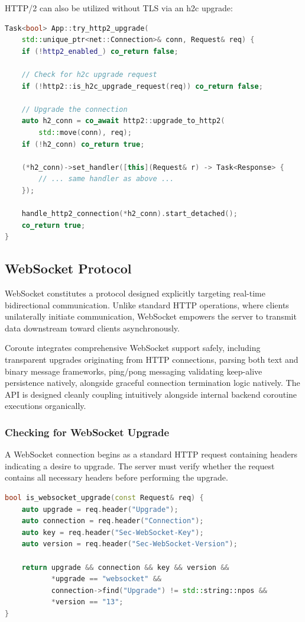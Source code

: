 HTTP/2 can also be utilized without TLS via an h2c upgrade:

\begin{lstlisting}[language=C++, basicstyle=\small\ttfamily, caption={h2c upgrade}]
Task<bool> App::try_http2_upgrade(
    std::unique_ptr<net::Connection>& conn, Request& req) {
    if (!http2_enabled_) co_return false;
    
    // Check for h2c upgrade request
    if (!http2::is_h2c_upgrade_request(req)) co_return false;
    
    // Upgrade the connection
    auto h2_conn = co_await http2::upgrade_to_http2(
        std::move(conn), req);
    if (!h2_conn) co_return true;
    
    (*h2_conn)->set_handler([this](Request& r) -> Task<Response> {
        // ... same handler as above ...
    });
    
    handle_http2_connection(*h2_conn).start_detached();
    co_return true;
}
\end{lstlisting}

\subsection{WebSocket Protocol}

WebSocket \cite{rfc6455} constitutes a protocol designed explicitly targeting real-time bidirectional communication. Unlike standard HTTP operations, where clients unilaterally initiate communication, WebSocket empowers the server to transmit data downstream toward clients asynchronously.

Coroute integrates comprehensive WebSocket support safely, including transparent upgrades originating from HTTP connections, parsing both text and binary message frameworks, ping/pong messaging validating keep-alive persistence natively, alongside graceful connection termination logic natively. The API is designed cleanly coupling intuitively alongside internal backend coroutine executions organically.

\subsubsection{Checking for WebSocket Upgrade}

A WebSocket connection begins as a standard HTTP request containing headers indicating a desire to upgrade. The server must verify whether the request contains all necessary headers before performing the upgrade.

\begin{lstlisting}[language=C++, basicstyle=\small\ttfamily, caption={WebSocket upgrade detection}]
bool is_websocket_upgrade(const Request& req) {
    auto upgrade = req.header("Upgrade");
    auto connection = req.header("Connection");
    auto key = req.header("Sec-WebSocket-Key");
    auto version = req.header("Sec-WebSocket-Version");
    
    return upgrade && connection && key && version &&
           *upgrade == "websocket" &&
           connection->find("Upgrade") != std::string::npos &&
           *version == "13";
}
\end{lstlisting}

